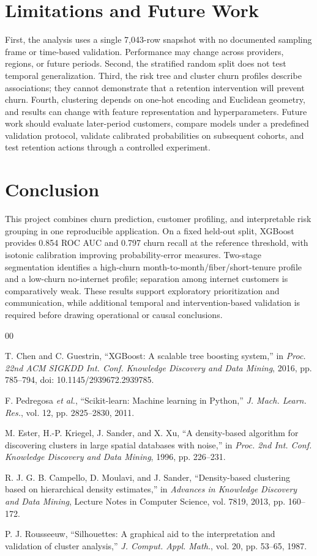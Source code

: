 \documentclass[conference]{IEEEtran}
\begin{document}
\section{Limitations and Future Work}
First, the analysis uses a single 7,043-row snapshot with no documented sampling frame or time-based validation. Performance may change across providers, regions, or future periods. Second, the stratified random split does not test temporal generalization. Third, the risk tree and cluster churn profiles describe associations; they cannot demonstrate that a retention intervention will prevent churn. Fourth, clustering depends on one-hot encoding and Euclidean geometry, and results can change with feature representation and hyperparameters. Future work should evaluate later-period customers, compare models under a predefined validation protocol, validate calibrated probabilities on subsequent cohorts, and test retention actions through a controlled experiment.

\section{Conclusion}
This project combines churn prediction, customer profiling, and interpretable risk grouping in one reproducible application. On a fixed held-out split, XGBoost provides 0.854 ROC AUC and 0.797 churn recall at the reference threshold, with isotonic calibration improving probability-error measures. Two-stage segmentation identifies a high-churn month-to-month/fiber/short-tenure profile and a low-churn no-internet profile; separation among internet customers is comparatively weak. These results support exploratory prioritization and communication, while additional temporal and intervention-based validation is required before drawing operational or causal conclusions.

\begin{thebibliography}{00}

T. Chen and C. Guestrin, ``XGBoost: A scalable tree boosting system,'' in \emph{Proc. 22nd ACM SIGKDD Int. Conf. Knowledge Discovery and Data Mining}, 2016, pp. 785--794, doi: 10.1145/2939672.2939785.

F. Pedregosa \emph{et al.}, ``Scikit-learn: Machine learning in Python,'' \emph{J. Mach. Learn. Res.}, vol. 12, pp. 2825--2830, 2011.

M. Ester, H.-P. Kriegel, J. Sander, and X. Xu, ``A density-based algorithm for discovering clusters in large spatial databases with noise,'' in \emph{Proc. 2nd Int. Conf. Knowledge Discovery and Data Mining}, 1996, pp. 226--231.

R. J. G. B. Campello, D. Moulavi, and J. Sander, ``Density-based clustering based on hierarchical density estimates,'' in \emph{Advances in Knowledge Discovery and Data Mining}, Lecture Notes in Computer Science, vol. 7819, 2013, pp. 160--172.

P. J. Rousseeuw, ``Silhouettes: A graphical aid to the interpretation and validation of cluster analysis,'' \emph{J. Comput. Appl. Math.}, vol. 20, pp. 53--65, 1987.

\end{thebibliography}
\end{document}
